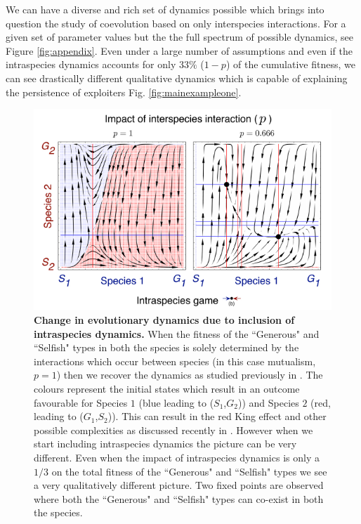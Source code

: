 \documentclass[12pt]{article}
\begin{document}
We can have a diverse and rich set of dynamics possible which brings into question the study of coevolution based on only interspecies interactions. 
For a given set of parameter values but the the full spectrum of possible dynamics, see Figure \ref{fig:appendix}.
Even under a large number of assumptions and even if the intraspecies dynamics accounts for only $33\%$ ($1-p$) of the cumulative fitness, we can see drastically different qualitative dynamics which is capable of explaining the persistence of exploiters Fig. \ref{fig:mainexampleone}.

\begin{figure}
\begin{center}
\includegraphics[width=\columnwidth]{../Figures/mainexample2.pdf}
\caption{\small{
\textbf{Change in evolutionary dynamics due to inclusion of intraspecies dynamics.} When the fitness of the ``Generous" and ``Selfish" types in both the species is solely determined by the interactions which occur between species (in this case mutualism, $p=1$) then we recover the dynamics as studied previously in \citep{gokhale:PRSB:2012}. The colours represent the initial states which result in an outcome favourable for Species $1$ (blue leading to ($S_1$,$G_2$)) and Species $2$ (red, leading to ($G_1$,$S_2$)). This can result in the red King effect and other possible complexities as discussed recently in \citep{gao:SciRep:2015}. However when we start including intraspecies dynamics the picture can be very different.
Even when the impact of intraspecies dynamics is only a $1/3$ on the total fitness of the ``Generous" and ``Selfish" types we see a very qualitatively different picture.
Two fixed points are observed where both the ``Generous" and ``Selfish" types can co-exist in both the species.
}}
\end{center}
\end{figure}
\end{document}
